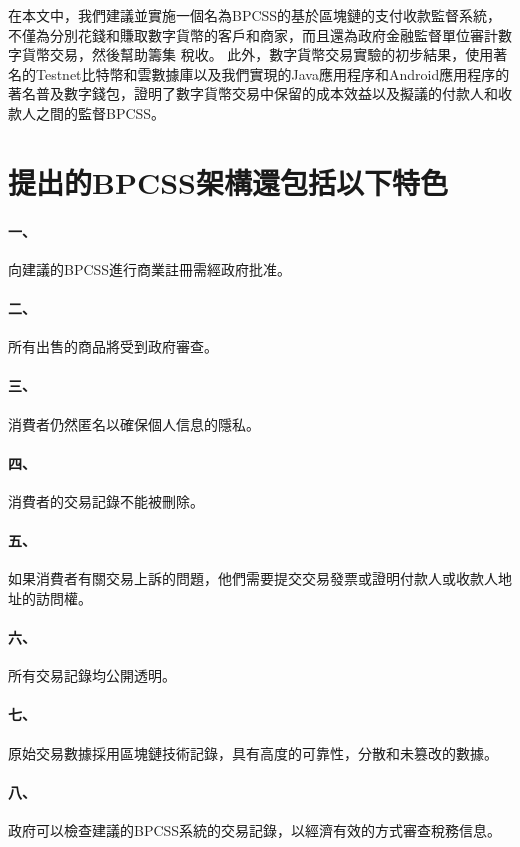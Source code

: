 
在本文中，我們建議並實施一個名為BPCSS的基於區塊鏈的支付收款監督系統，不僅為分別花錢和賺取數字貨幣的客戶和商家，而且還為政府金融監督單位審計數字貨幣交易，然後幫助籌集 稅收。 此外，數字貨幣交易實驗的初步結果，使用著名的Testnet比特幣和雲數據庫以及我們實現的Java應用程序和Android應用程序的著名普及數字錢包，證明了數字貨幣交易中保留的成本效益以及擬議的付款人和收款人之間的監督BPCSS。
	
	\section{提出的BPCSS架構還包括以下特色}

		\paragraph{一、}向建議的BPCSS進行商業註冊需經政府批准。
		\paragraph{二、}所有出售的商品將受到政府審查。
		\paragraph{三、}消費者仍然匿名以確保個人信息的隱私。
		\paragraph{四、}消費者的交易記錄不能被刪除。
		\paragraph{五、}如果消費者有關交易上訴的問題，他們需要提交交易發票或證明付款人或收款人地址的訪問權。
		\paragraph{六、}所有交易記錄均公開透明。
		\paragraph{七、}原始交易數據採用區塊鏈技術記錄，具有高度的可靠性，分散和未篡改的數據。
		\paragraph{八、}政府可以檢查建議的BPCSS系統的交易記錄，以經濟有效的方式審查稅務信息。

